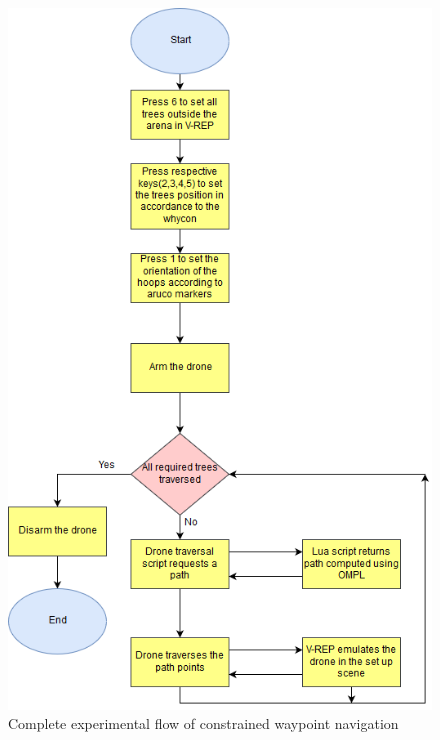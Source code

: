 \begin{figure}[H]
    \centering
    \includegraphics[]{SummerInterReport/project/Images-Major/completeEy.png}
    \caption{Complete experimental flow of constrained waypoint navigation}
    \label{fig:compEy}
\end{figure}

